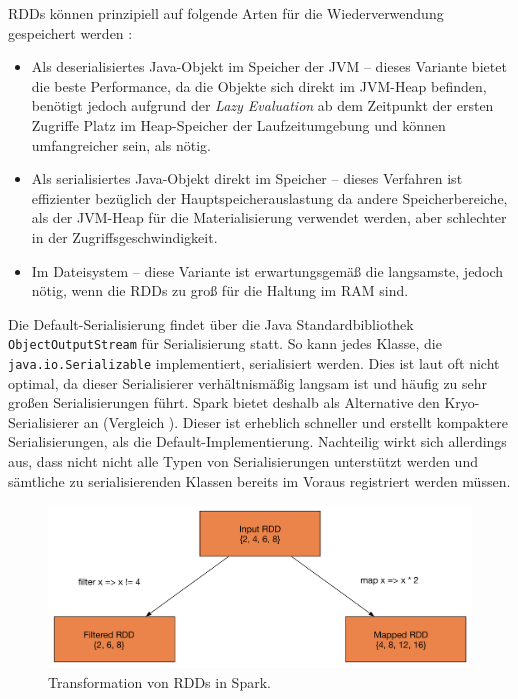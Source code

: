 RDDs können prinzipiell auf folgende Arten für die Wiederverwendung gespeichert werden :
\begin{itemize}
		\item Als deserialisiertes Java-Objekt im Speicher der JVM – dieses Variante bietet die beste Performance, da die Objekte sich direkt im JVM-Heap befinden, benötigt jedoch aufgrund der \textit{Lazy Evaluation} ab dem Zeitpunkt der ersten Zugriffe Platz im Heap-Speicher der Laufzeitumgebung und können umfangreicher sein, als nötig. 
		\item Als serialisiertes Java-Objekt direkt im Speicher – dieses Verfahren ist effizienter bezüglich der Hauptspeicherauslastung da andere Speicherbereiche, als der JVM-Heap für die Materialisierung verwendet werden, aber schlechter in der Zugriffsgeschwindigkeit.
		\item Im Dateisystem – diese Variante ist erwartungsgemäß die langsamste, jedoch nötig, wenn die RDDs zu groß für die Haltung im RAM sind. 		
\end{itemize}	

Die Default-Serialisierung findet über die Java Standardbibliothek \texttt{ObjectOutputStream} für Serialisierung statt. So kann jedes Klasse, die \texttt{java.io.Serializable} implementiert, serialisiert werden. Dies ist laut   oft nicht optimal, da dieser Serialisierer verhältnismäßig langsam ist und häufig zu sehr großen Serialisierungen führt. Spark bietet deshalb als Alternative den Kryo-Serialisierer an (Vergleich ). Dieser ist erheblich schneller und erstellt kompaktere Serialisierungen, als die Default-Implementierung. Nachteilig wirkt sich allerdings aus, dass nicht nicht alle Typen von Serialisierungen unterstützt werden und sämtliche zu serialisierenden Klassen bereits im Voraus registriert werden müssen.  

  

\begin{figure}[htb!]
\centering
\includegraphics[width=1.0\textwidth]{bilder/transform.png}
\caption{Transformation von RDDs in Spark.}
\label{fig:sparktransform}
\end{figure} 


